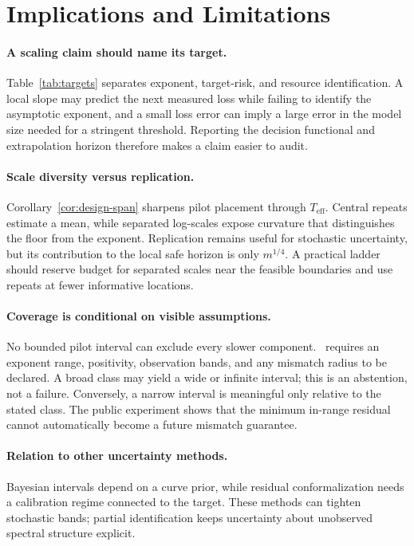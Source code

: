 \section{Implications and Limitations}

\paragraph{A scaling claim should name its target.}
Table~\ref{tab:targets} separates exponent, target-risk, and resource identification. A local slope may predict the next measured loss while failing to identify the asymptotic exponent, and a small loss error can imply a large error in the model size needed for a stringent threshold. Reporting the decision functional and extrapolation horizon therefore makes a claim easier to audit.

\paragraph{Scale diversity versus replication.}
Corollary~\ref{cor:design-span} sharpens pilot placement through $T_{\mathrm{eff}}$. Central repeats estimate a mean, while separated log-scales expose curvature that distinguishes the floor from the exponent. Replication remains useful for stochastic uncertainty, but its contribution to the local safe horizon is only $m^{1/4}$. A practical ladder should reserve budget for separated scales near the feasible boundaries and use repeats at fewer informative locations.

\paragraph{Coverage is conditional on visible assumptions.}
No bounded pilot interval can exclude every slower component. \ScaleCert\ requires an exponent range, positivity, observation bands, and any mismatch radius to be declared. A broad class may yield a wide or infinite interval; this is an abstention, not a failure. Conversely, a narrow interval is meaningful only relative to the stated class. The public experiment shows that the minimum in-range residual cannot automatically become a future mismatch guarantee.

\paragraph{Relation to other uncertainty methods.}
Bayesian intervals depend on a curve prior, while residual conformalization needs a calibration regime connected to the target. These methods can tighten stochastic bands; partial identification keeps uncertainty about unobserved spectral structure explicit.


